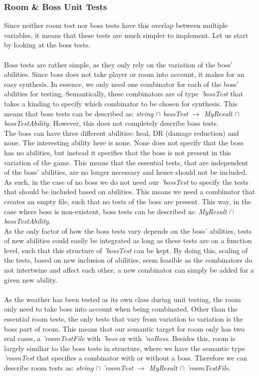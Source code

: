 \subsubsection{Room \& Boss Unit Tests}
Since neither room test nor boss tests have this overlap between multiple variables, it means that these tests are much simpler to implement. Let us start by looking at the boss tests. \\
\\
Boss tests are rather simple, as they only rely on the variation of the boss' abilities. Since boss does not take player or room into account, it makes for an easy synthesis. In essence, we only need one combinator for each of the boss' abilities for testing. Semantically, these combinators are of type \textit{'bossTest} that takes a kinding to specify which combinator to be chosen for synthesis. This means that boss tests can be described as: \textit{string $\cap$ bossTest $\to$ MyResult $\cap$ bossTestAbility}. However, this does not completely describe boss tests. \\
The boss can have three different abilities: heal, DR (damage reduction) and none. The interesting ability here is none. None does not specify that the boss has no abilities, but instead it specifies that the boss is not present in this variation of the game. This means that the essential tests, that are independent of the boss' abilities, are no longer necessary and hence should not be included. As such, in the case of no boss we do not need our \textit{'bossTest} to specify the tests that should be included based on abilities. This means we need a combinator that creates an empty file, such that no tests of the boss are present. This way, in the case where boss is non-existent, boss tests can be described as: \textit{MyResult $\cap$ bossTestAbility}.  \\
As the only factor of how the boss tests vary depends on the boss' abilities, tests of new abilities could easily be integrated as long as these tests are on a function level, such that this structure of \textit{'bossTest} can be kept. By doing this, scaling of the tests, based on new inclusion of abilities, seem feasible as the combinators do not intertwine and affect each other, a new combinator can simply be added for a given new ability. %
\\ \\
As the weather has been tested as its own class during unit testing, the room only need to take boss into account when being combinated. Other than the essential room tests, the only tests that vary from variation to variation is the boss part of room. This means that our semantic target for room only has two real cases, a \textit{'roomTestFile} with \textit{'boss} or with \textit{'noBoss}. Besides this, room is largely similiar to the boss tests in structure, where we have the semantic type \textit{'roomTest} that specifies a combinator with or without a boss. Therefore we can describe room tests as: \textit{string $\cap$ 'roomTest $\to$ MyResult $\cap$ 'roomTestFile}. 